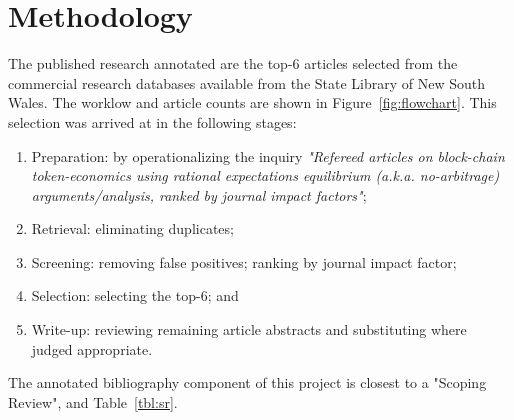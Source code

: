 \documentclass[11pt]{article}
\begin{document}
\appendix

\section{Methodology}
The published research annotated are the top-6 articles selected from the commercial research databases available from the State Library of New South Wales. The worklow and article counts are shown in Figure~\ref{fig:flowchart}.  This selection was arrived at in the following stages:
\begin{enumerate}
    \item Preparation:
    by operationalizing the inquiry \textit{"Refereed articles on block-chain token-economics using rational expectations equilibrium (a.k.a. no-arbitrage) arguments/analysis, ranked by journal impact factors"};
    \item Retrieval:
    eliminating duplicates;
    \item Screening:
    removing false positives;
    ranking by journal impact factor;
    \item Selection:
    selecting the top-6; and
    \item Write-up:
    reviewing remaining article abstracts and substituting where judged appropriate.
\end{enumerate}


The annotated bibliography component of this project is closest to a "Scoping Review"\autocite{grant09}, and Table~\ref{tbl:sr}.
\end{document}
